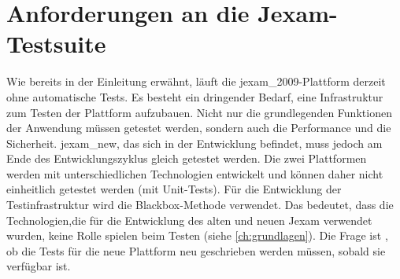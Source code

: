 \section{Anforderungen an die Jexam-Testsuite}

Wie bereits in der Einleitung erwähnt, läuft die \Gls{jexam_2009}-Plattform
derzeit ohne automatische Tests. Es besteht ein dringender Bedarf, eine
Infrastruktur zum Testen der Plattform aufzubauen. Nicht nur die
grundlegenden Funktionen der Anwendung müssen getestet werden, sondern auch
die Performance und die Sicherheit. \Gls{jexam_new}, das sich in der Entwicklung
befindet, muss jedoch am Ende des Entwicklungszyklus gleich getestet werden.
Die zwei Plattformen werden mit unterschiedlichen Technologien entwickelt
und können daher nicht einheitlich getestet werden (mit Unit-Tests). Für
die Entwicklung der Testinfrastruktur wird die Blackbox-Methode verwendet.
Das bedeutet, dass die Technologien,die für die Entwicklung des alten und neuen Jexam verwendet wurden,
keine Rolle spielen beim Testen (siehe \autoref{ch:grundlagen}).
Die Frage ist , ob die Tests für die neue Plattform neu geschrieben werden
müssen, sobald sie verfügbar ist.




